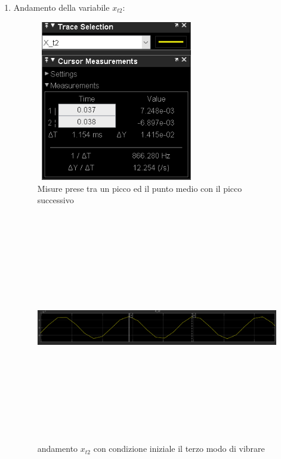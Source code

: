 \documentclass{article}
\begin{document}
\begin{enumerate}
    \item
       Andamento della variabile $x_{t2}$:
\begin{figure}[H]
\centering
\includegraphics[width=7cm,height=7cm,keepaspectratio]{./simulink/assex/modo3_t2tab.png}
\caption{Misure prese tra un picco ed il punto medio con il picco successivo}
\end{figure}

\begin{figure}[H]
\centering
\includegraphics[width=12cm,height=10cm,keepaspectratio]{./simulink/assex/modo3_t2.png}
\caption{andamento $x_{t2}$ con condizione iniziale il terzo modo di vibrare}
\end{figure}
      

\end{enumerate}
\end{document}
